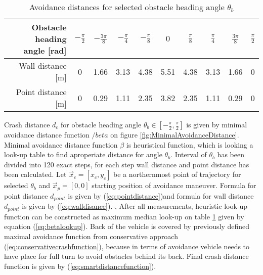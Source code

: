 \begin{table}[H]
    \centering
    \begin{tabular}{|r||c|c|c|c|c|c|c|c|c|}
        \hline
        \twolinecellr{Obstacle heading\\ angle [rad]} & $-\frac{\pi}{2}$ & $-\frac{3\pi}{8}$ & $-\frac{\pi}{4}$ & $-\frac{\pi}{8} $ & $0$    & $\frac{\pi}{8}$ & $\frac{\pi}{4}$ & $\frac{3\pi}{8}$ & $\frac{\pi}{2}$ \\
        \hline
        Wall distance [m]       &     0	&  1.66 &  3.13	&  4.38 & 5.51 & 4.38 & 3.13 & 1.66	& 0 \\
        \hline
        Point distance [m]      &     0	&  0.29	&  1.11 &  2.35 & 3.82 & 2.35 &	1.11 & 0.29	& 0\\
        \hline
    \end{tabular}
    \caption{Avoidance distances for selected obstacle heading angle $\theta_b$}
    \label{tab:avoidanceDistances}
\end{table}

Crash distance $d_c$ for obstacle heading angle $\theta_b \in [-\frac{\pi}{2},\frac{\pi}{2}]$ is given by minimal avoidance distance function $/beta$ on figure \ref{fig:MinimalAvoidanceDistance}. Minimal avoidance distance function $\beta$ is heuristical function, which is looking a look-up table to find aproperiate distance for angle $\theta_b$. Interval of $\theta_b$ has been divided into 120 exact steps, for each step wall distance and point distance has been calculated. Let $\vec{x}_c = [x_c,y_c]$ be a northernmost point of trajectory for selected $\theta_b$ and $\vec{x}_p=[0,0]$ starting position of avoidance maneuver. Formula for point distance $d_{point}$ is given by (\ref{eq:pointdistance})and formula for wall distance $d_{point}$ is given by (\ref{eq:walldisance}).
. After all measurements, heuristic look-up function can be constructed as maximum median look-up on table \ref{tab:avoidanceDistances} given by equation (\ref{eq:betalookup}). Back of the vehicle is covered by previously defined maximal avoidance function from conservative approach (\ref{eq:conservativecrashfunction}), because in terms of avoidance vehicle needs to have place for full turn to avoid obstacles behind its back. Final crash distance function is given by (\ref{eq:smartdistancefunction}).

